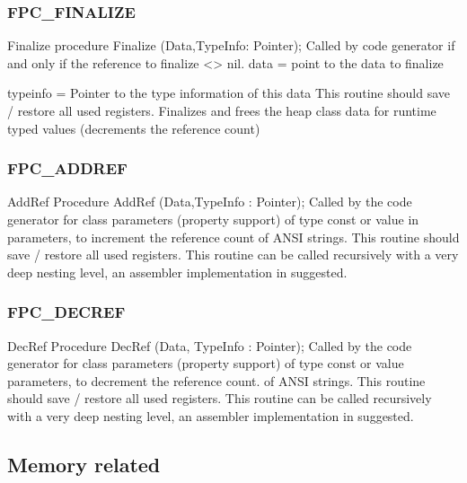 \documentclass [a4paper,12pt]{article}
\begin{document}
\subsubsection{FPC{\_}FINALIZE}
\label{subsubsec:mylabel72}

\begin{procedure}{Finalize}
\Declaration
procedure Finalize (Data,TypeInfo: Pointer);
\Description
Called by code generator if and only if the reference to finalize <> nil.
\Parameters
data = point to the data to finalize \par
typeinfo = Pointer to the type information of this data
\Notes
This routine should save / restore all used registers. Finalizes and frees
the heap class data for runtime typed values (decrements the reference
count)
\end{procedure}

\subsubsection{FPC{\_}ADDREF}
\label{subsubsec:mylabel73}

\begin{procedure}{AddRef}
\Declaration
Procedure AddRef (Data,TypeInfo : Pointer);
\Description
Called by the code generator for class parameters (property support) of type
const or value in parameters, to increment the reference count of ANSI
strings.
\Notes
This routine should save / restore all used registers. This routine can be
called recursively with a very deep nesting level, an assembler
implementation in suggested.
\end{procedure}

\subsubsection{FPC{\_}DECREF}
\label{subsubsec:mylabel74}

\begin{procedure}{DecRef}
\Declaration
Procedure DecRef (Data, TypeInfo : Pointer);
\Description
Called by the code generator for class parameters (property support) of type
const or value parameters, to decrement the reference count. of ANSI
strings.
\Parameters
\Notes
This routine should save / restore all used registers. This routine can be
called recursively with a very deep nesting level, an assembler
implementation in suggested.
\end{procedure}

\subsection{Memory related}
\label{subsec:memory}
\end{document}
